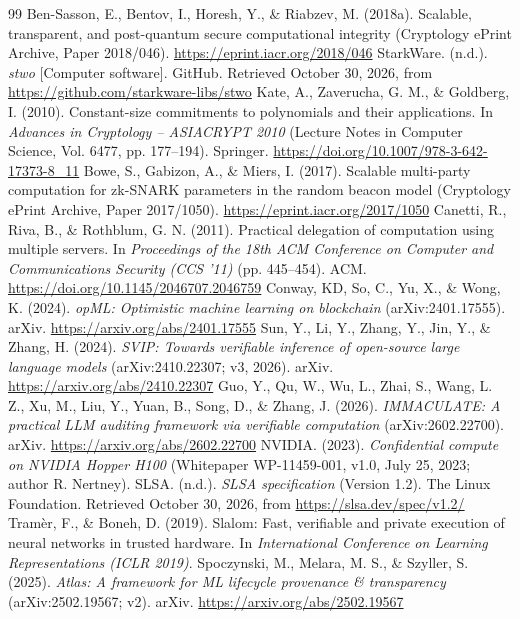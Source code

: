 \documentclass[11pt]{article}
\begin{document}
\begin{thebibliography}{99}
 Ben-Sasson, E., Bentov, I., Horesh, Y., \& Riabzev, M. (2018a). Scalable, transparent, and post-quantum secure computational integrity (Cryptology ePrint Archive, Paper 2018/046). \url{https://eprint.iacr.org/2018/046}
 StarkWare. (n.d.). \emph{stwo} [Computer software]. GitHub. Retrieved October 30, 2026, from \url{https://github.com/starkware-libs/stwo}
 Kate, A., Zaverucha, G. M., \& Goldberg, I. (2010). Constant-size commitments to polynomials and their applications. In \emph{Advances in Cryptology -- ASIACRYPT 2010} (Lecture Notes in Computer Science, Vol. 6477, pp. 177--194). Springer. \url{https://doi.org/10.1007/978-3-642-17373-8_11}
 Bowe, S., Gabizon, A., \& Miers, I. (2017). Scalable multi-party computation for zk-SNARK parameters in the random beacon model (Cryptology ePrint Archive, Paper 2017/1050). \url{https://eprint.iacr.org/2017/1050}
 Canetti, R., Riva, B., \& Rothblum, G. N. (2011). Practical delegation of computation using multiple servers. In \emph{Proceedings of the 18th ACM Conference on Computer and Communications Security (CCS '11)} (pp. 445--454). ACM. \url{https://doi.org/10.1145/2046707.2046759}
 Conway, KD, So, C., Yu, X., \& Wong, K. (2024). \emph{opML: Optimistic machine learning on blockchain} (arXiv:2401.17555). arXiv. \url{https://arxiv.org/abs/2401.17555}
 Sun, Y., Li, Y., Zhang, Y., Jin, Y., \& Zhang, H. (2024). \emph{SVIP: Towards verifiable inference of open-source large language models} (arXiv:2410.22307; v3, 2026). arXiv. \url{https://arxiv.org/abs/2410.22307}
 Guo, Y., Qu, W., Wu, L., Zhai, S., Wang, L. Z., Xu, M., Liu, Y., Yuan, B., Song, D., \& Zhang, J. (2026). \emph{IMMACULATE: A practical LLM auditing framework via verifiable computation} (arXiv:2602.22700). arXiv. \url{https://arxiv.org/abs/2602.22700}
 NVIDIA. (2023). \emph{Confidential compute on NVIDIA Hopper H100} (Whitepaper WP-11459-001, v1.0, July 25, 2023; author R. Nertney).
 SLSA. (n.d.). \emph{SLSA specification} (Version 1.2). The Linux Foundation. Retrieved October 30, 2026, from \url{https://slsa.dev/spec/v1.2/}
 Tram\`{e}r, F., \& Boneh, D. (2019). Slalom: Fast, verifiable and private execution of neural networks in trusted hardware. In \emph{International Conference on Learning Representations (ICLR 2019)}.
 Spoczynski, M., Melara, M. S., \& Szyller, S. (2025). \emph{Atlas: A framework for ML lifecycle provenance \& transparency} (arXiv:2502.19567; v2). arXiv. \url{https://arxiv.org/abs/2502.19567}

\end{thebibliography}
\end{document}
